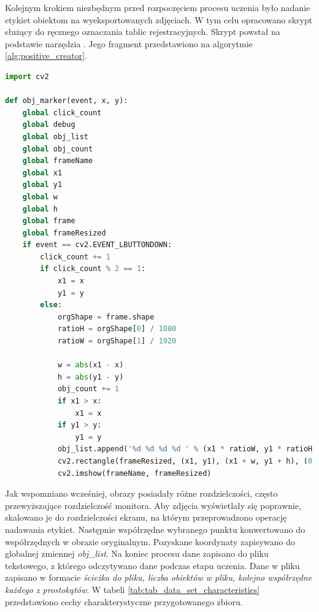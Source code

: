 Kolejnym krokiem niezbędnym przed rozpoczęciem procesu uczenia było nadanie etykiet obiektom na wyeksportowanych zdjęciach.
W tym celu opracowano skrypt służący do ręcznego oznaczania tablic rejestracyjnych.
Skrypt powstał na podstawie narzędzia \cite{haar_object_marker}.
Jego fragment przedstawiono na algorytmie \ref{alg:positive_creator}.
\begin{lstlisting}[language=Python, caption=Funkcja do oznaczania fragmentów obrazu zawierających poszukiwany obiekt., label=alg:positive_creator]
import cv2

def obj_marker(event, x, y):
    global click_count
    global debug
    global obj_list
    global obj_count
    global frameName
    global x1
    global y1
    global w
    global h
    global frame
    global frameResized
    if event == cv2.EVENT_LBUTTONDOWN:
        click_count += 1
        if click_count % 2 == 1:
            x1 = x
            y1 = y
        else:
            orgShape = frame.shape
            ratioH = orgShape[0] / 1080
            ratioW = orgShape[1] / 1920

            w = abs(x1 - x)
            h = abs(y1 - y)
            obj_count += 1
            if x1 > x:
                x1 = x
            if y1 > y:
                y1 = y
            obj_list.append('%d %d %d %d ' % (x1 * ratioW, y1 * ratioH, w * ratioW, h * ratioH))
            cv2.rectangle(frameResized, (x1, y1), (x1 + w, y1 + h), (0, 255, 0), 1)
            cv2.imshow(frameName, frameResized)
\end{lstlisting}
Jak wspomniano wcześniej, obrazy posiadały różne rozdzielczości, często przewyższające rozdzielczość monitora.
Aby zdjęcia wyświetlały się poprawnie, skalowano je do rozdzielczości ekranu, na którym przeprowadzono operację nadawania etykiet.
Następnie współrzędne wybranego punktu konwertowano do współrzędnych w obrazie oryginalnym.
Pozyskane koordynaty zapisywano do globalnej zmiennej \textit{obj\_list}.
Na koniec procesu dane zapisano do pliku tekstowego, z którego odczytywano dane podczas etapu uczenia.
Dane w pliku zapisano w formacie \textit{ścieżka do pliku, liczba obiektów w pliku, kolejno współrzędne każdego z prostokątów}.
W tabeli \ref{tab:tab_data_set_characteristics} przedstawiono cechy charakterystyczne przygotowanego zbioru.
